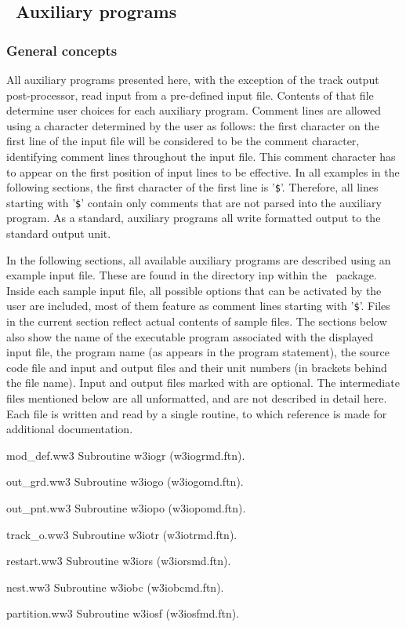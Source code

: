 \vssub
\subsection{~Auxiliary programs} \label{sec:auxprog}

\vsssub
\subsubsection{General concepts}
\vsssub

All auxiliary programs presented here, with the exception of the track output
post-processor, read input from a pre-defined input file. Contents of that file
determine user choices for each auxiliary program. Comment lines are allowed
using a character determined by the user as follows: the first character
on the first line of the input file will be considered to be the comment
character, identifying comment lines throughout the input file. This comment character
has to appear on the first position of input lines to be effective. In all
examples in the following sections, the first character of the first line
is '{\tt \$}'. Therefore, all lines starting with '{\tt \$}' contain only
comments that are not parsed into the auxiliary program. As a standard,
auxiliary programs all write formatted output to the standard output unit.

In the following sections, all available auxiliary programs are described
using an example input file. These are found in the directory {\code inp} within the
\ws\ package. Inside each sample input file, all possible options that can be activated
by the user are included, most of them feature as comment lines starting with '{\tt \$}'.
Files in the current section reflect actual contents of sample files.
The sections below also show the name of the executable program associated with the 
displayed input file, the program name (as appears in the program statement), 
the source code file and input and output files and their unit numbers (in brackets 
behind the file name). Input and output files marked with \opt are optional. The 
intermediate files mentioned below are all {\F unformatted}, and are not described 
in detail here. Each file is written and read by a single routine, to which
reference is made for additional documentation.

\begin{list}{}{\itemsep 0mm \parsep 0mm \leftmargin 40mm }
\item[{mod\_def.ww3} \hfill] Subroutine {\F w3iogr} ({\file w3iogrmd.ftn}).
\item[{out\_grd.ww3} \hfill] Subroutine {\F w3iogo} ({\file w3iogomd.ftn}).
\item[{out\_pnt.ww3} \hfill] Subroutine {\F w3iopo} ({\file w3iopomd.ftn}).
\item[{track\_o.ww3} \hfill] Subroutine {\F w3iotr} ({\file w3iotrmd.ftn}).
\item[{restart.ww3}  \hfill] Subroutine {\F w3iors} ({\file w3iorsmd.ftn}).
\item[{nest.ww3}     \hfill] Subroutine {\F w3iobc} ({\file w3iobcmd.ftn}).
\item[{partition.ww3}\hfill] Subroutine {\F w3iosf} ({\file w3iosfmd.ftn}).
\end{list}

